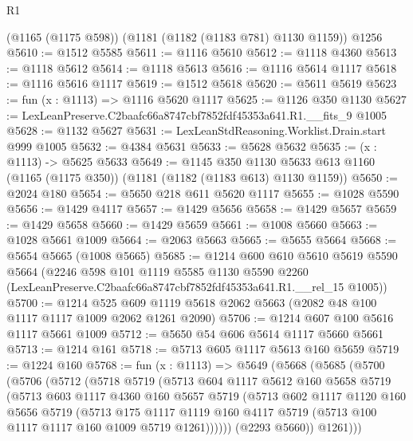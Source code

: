 \begin{lexlean}{R1}
\begin{coremodule}
    (@1165 (@1175 @598))
    (@1181 (@1182 (@1183 @781) @1130 @1159))
    @1256
@5610 := @1512 @5585
@5611 := @1116 @5610
@5612 := @1118 @4360
@5613 := @1118 @5612
@5614 := @1118 @5613
@5616 := @1116 @5614 @1117
@5618 := @1116 @5616 @1117
@5619 := @1512 @5618
@5620 := @5611 @5619
@5623 := fun (x : @1113) => @1116 @5620 @1117
@5625 := @1126 @350 @1130
@5627 := LexLeanPreserve.C2baafc66a8747cbf7852fdf45353a641.R1.__fits_9 @1005
@5628 := @1132 @5627
@5631 := LexLeanStdReasoning.Worklist.Drain.start @999 @1005
@5632 := @4384 @5631
@5633 := @5628 @5632
@5635 := (x : @1113) -> @5625 @5633
@5649 := @1145
    @350
    @1130
    @5633
    @613
    @1160
    (@1165 (@1175 @350))
    (@1181 (@1182 (@1183 @613) @1130 @1159))
@5650 := @2024 @180
@5654 := @5650 @218 @611 @5620 @1117
@5655 := @1028 @5590
@5656 := @1429 @4117
@5657 := @1429 @5656
@5658 := @1429 @5657
@5659 := @1429 @5658
@5660 := @1429 @5659
@5661 := @1008 @5660
@5663 := @1028 @5661 @1009
@5664 := @2063 @5663
@5665 := @5655 @5664
@5668 := @5654 @5665 (@1008 @5665)
@5685 := @1214
    @600
    @610
    @5610
    @5619
    @5590
    @5664
    (@2246
      @598
      @101
      @1119
      @5585
      @1130
      @5590
      @2260
      (LexLeanPreserve.C2baafc66a8747cbf7852fdf45353a641.R1.__rel_15 @1005))
@5700 := @1214
    @525
    @609
    @1119
    @5618
    @2062
    @5663
    (@2082 @48 @100 @1117 @1117 @1009 @2062 @1261 @2090)
@5706 := @1214 @607 @100 @5616 @1117 @5661 @1009
@5712 := @5650 @54 @606 @5614 @1117 @5660 @5661
@5713 := @1214 @161
@5718 := @5713 @605 @1117 @5613 @160 @5659
@5719 := @1224 @160
@5768 := fun (x : @1113) =>
  @5649
    (@5668
      (@5685
        (@5700
          (@5706
            (@5712
              (@5718
                @5719
                (@5713
                  @604
                  @1117
                  @5612
                  @160
                  @5658
                  @5719
                  (@5713
                    @603
                    @1117
                    @4360
                    @160
                    @5657
                    @5719
                    (@5713
                      @602
                      @1117
                      @1120
                      @160
                      @5656
                      @5719
                      (@5713
                        @175
                        @1117
                        @1119
                        @160
                        @4117
                        @5719
                        (@5713 @100 @1117 @1117 @160 @1009 @5719 @1261))))))
              (@2293 @5660))
            @1261)))

\end{coremodule}
\end{lexlean}
